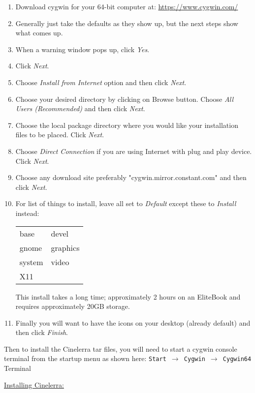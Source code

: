 \begin{enumerate}
	\item Download cygwin for your 64-bit computer at: {\small \url{https://www.cygwin.com/}}
	\item Generally just take the defaults as they show up, but the next steps show what comes up.
	\item When a warning window pops up, click \textit{Yes}.
	\item Click \textit{Next}.
	\item Choose \textit{Install from Internet} option and then click \textit{Next}.
	\item Choose your desired directory by clicking on Browse button. Choose \textit{All Users (Recommended)} and then click \textit{Next}.
	\item Choose the local package directory where you would like your installation files to be placed. Click \textit{Next}.
	\item Choose \textit{Direct Connection} if you are using Internet with plug and play device. Click \textit{Next}.
	\item Choose any download site preferably "cygwin.mirror.constant.com" and then click \textit{Next}.
	\item For list of things to install, leave all set to \textit{Default} except these to \textit{Install} instead:

\begin{tabular}{ll}
	base& devel\\
	gnome& graphics\\
	system& video\\
	X11 \\
\end{tabular}

     This install takes a long time; approximately 2 hours on an EliteBook and requires approximately 20GB storage.
	\item Finally you will want to have the icons on your desktop (already default) and then click \textit{Finish}.
\end{enumerate}

Then to install the Cinelerra tar files, you will need to start a cygwin console terminal from the startup menu as shown here:
	\texttt{Start $\rightarrow$ Cygwin $\rightarrow$ Cygwin64} Terminal

\underline{Installing Cinelerra:}

